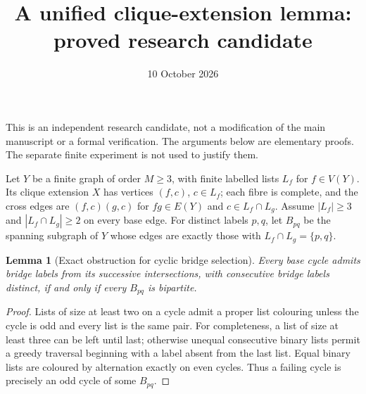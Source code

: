 \documentclass[11pt]{article}
\newtheorem{lemma}{Lemma}
\begin{document}
\title{A unified clique-extension lemma: proved research candidate}
\author{}\date{10 October 2026}\maketitle
This is an independent research candidate, not a modification of the main
manuscript or a formal verification. The arguments below are elementary
proofs. The separate finite experiment is not used to justify them.

Let $Y$ be a finite graph of order $M\ge3$, with finite labelled lists
$L_f$ for $f\in V(Y)$. Its clique extension $X$ has vertices $(f,c)$,
$c\in L_f$; each fibre is complete, and the cross edges are
$(f,c)(g,c)$ for $fg\in E(Y)$ and $c\in L_f\cap L_g$.
Assume $|L_f|\ge3$ and $|L_f\cap L_g|\ge2$ on every base edge.
For distinct labels $p,q$, let $B_{pq}$ be the spanning subgraph of $Y$
whose edges are exactly those with $L_f\cap L_g=\{p,q\}$.

\begin{lemma}[Exact obstruction for cyclic bridge selection]
Every base cycle admits bridge labels from its successive intersections,
with consecutive bridge labels distinct, if and only if every $B_{pq}$
is bipartite.
\end{lemma}
\begin{proof}
Lists of size at least two on a cycle admit a proper list colouring unless
the cycle is odd and every list is the same pair. For completeness, a list
of size at least three can be left until last; otherwise unequal consecutive binary
lists permit a greedy traversal beginning with a label absent from the
last list. Equal binary lists are coloured by alternation exactly on even
cycles. Thus a failing cycle is precisely an odd cycle of some $B_{pq}$.
\end{proof}
\end{document}
